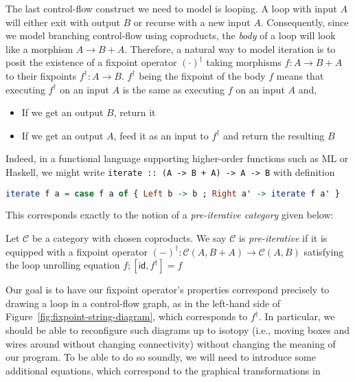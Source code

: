 \documentclass[acmsmall,screen,review]{acmart}
\newcommand{\mc}[1]{\ensuremath{\mathcal{#1}}}
\newcommand{\ms}[1]{\ensuremath{\mathsf{#1}}}
\begin{document}
The last control-flow construct we need to model is looping. A loop with input $A$ will either exit
with output $B$ or recurse with a new input $A$. Consequently, since we model branching control-flow
using coproducts, the \emph{body} of a loop will look like a morphism $A \to B + A$. Therefore, a
natural way to model iteration is to posit the existence of a fixpoint operator $(\cdot)^\dagger$
taking morphisms $f: A \to B + A$ to their fixpoints $f^\dagger: A \to B$. $f^\dagger$ being the
fixpoint of the body $f$ means that executing $f^\dagger$ on an input $A$ is the same as executing
$f$ on an input $A$ and,
\begin{itemize}
  \item If we get an output $B$, return it
  \item If we get an output $A$, feed it as an input to $f^\dagger$ and return the resulting $B$
\end{itemize}
Indeed, in a functional language supporting higher-order functions such as ML or Haskell, we might
write \texttt{iterate :: (A -> B + A) -> A -> B} with definition
\begin{center}
  \begin{minipage}{0.85\textwidth}
    \begin{lstlisting}[language=Haskell]
      iterate f a = case f a of { Left b -> b ; Right a' -> iterate f a' }
    \end{lstlisting}
  \end{minipage}
\end{center}
This corresponds exactly to the notion of a \emph{pre-iterative category} given below:
\begin{definition}
  Let $\mc{C}$ be a category with chosen coproducts. We say $\mc{C}$ is \emph{pre-iterative} if it
  is equipped with a fixpoint operator $(-)^\dagger : \mc{C}(A, B + A) \to \mc{C}(A, B)$ satisfying
  the loop unrolling equation $f ; [\ms{id}, f^\dagger] = f$
\end{definition}
Our goal is to have our fixpoint operator's properties correspond precisely to drawing a loop in a
control-flow graph, as in the left-hand side of Figure~\ref{fig:fixpoint-string-diagram}, which
corresponds to $f^\dagger$. In particular, we should be able to reconfigure such diagrams up to
isotopy (i.e., moving boxes and wires around without changing connectivity) without changing the
meaning of our program. To be able to do so soundly, we will need to introduce some additional
equations, which correspond to the graphical transformations in
\end{document}
